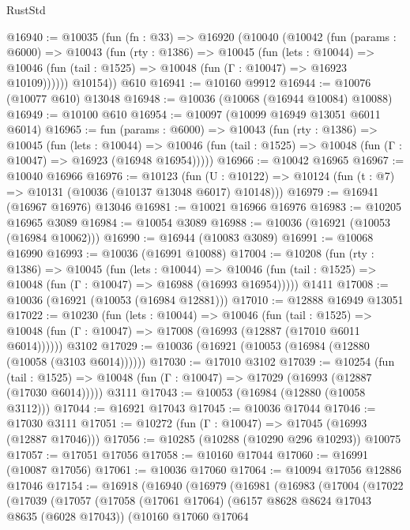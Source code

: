 \begin{lexlean}{RustStd}
\begin{coremodule}
{{@16940 := @10035
    (fun (fn : @33) =>
    @16920
      (@10040
        (@10042
          (fun (params : @6000) =>
          @10043
            (fun (rty : @1386) =>
            @10045
              (fun (lets : @10044) =>
              @10046 (fun (tail : @1525) => @10048 (fun (Γ : @10047) => @16923 @10109))))))
        @10154))
    @610
@16941 := @10160 @9912
@16944 := @10076 (@10077 @610) @13048
@16948 := @10036 (@10068 (@16944 @10084) @10088)
@16949 := @10100 @610
@16954 := @10097 (@10099 @16949 @13051 @6011 @6014)
@16965 := fun (params : @6000) =>
  @10043
    (fun (rty : @1386) =>
    @10045
      (fun (lets : @10044) =>
      @10046 (fun (tail : @1525) => @10048 (fun (Γ : @10047) => @16923 (@16948 @16954)))))
@16966 := @10042 @16965
@16967 := @10040 @16966
@16976 := @10123
    (fun (U : @10122) => @10124 (fun (t : @7) => @10131 (@10036 (@10137 @13048 @6017) @10148)))
@16979 := @16941 (@16967 @16976) @13046
@16981 := @10021 @16966 @16976
@16983 := @10205 @16965 @3089
@16984 := @10054 @3089
@16988 := @10036 (@16921 (@10053 (@16984 @10062)))
@16990 := @16944 (@10083 @3089)
@16991 := @10068 @16990
@16993 := @10036 (@16991 @10088)
@17004 := @10208
    (fun (rty : @1386) =>
    @10045
      (fun (lets : @10044) =>
      @10046 (fun (tail : @1525) => @10048 (fun (Γ : @10047) => @16988 (@16993 @16954)))))
    @1411
@17008 := @10036 (@16921 (@10053 (@16984 @12881)))
@17010 := @12888 @16949 @13051
@17022 := @10230
    (fun (lets : @10044) =>
    @10046
      (fun (tail : @1525) =>
      @10048 (fun (Γ : @10047) => @17008 (@16993 (@12887 (@17010 @6011 @6014))))))
    @3102
@17029 := @10036 (@16921 (@10053 (@16984 (@12880 (@10058 (@3103 @6014))))))
@17030 := @17010 @3102
@17039 := @10254
    (fun (tail : @1525) => @10048 (fun (Γ : @10047) => @17029 (@16993 (@12887 (@17030 @6014)))))
    @3111
@17043 := @10053 (@16984 (@12880 (@10058 @3112)))
@17044 := @16921 @17043
@17045 := @10036 @17044
@17046 := @17030 @3111
@17051 := @10272 (fun (Γ : @10047) => @17045 (@16993 (@12887 @17046)))
@17056 := @10285 (@10288 (@10290 @296 @10293)) @10075
@17057 := @17051 @17056
@17058 := @10160 @17044
@17060 := @16991 (@10087 @17056)
@17061 := @10036 @17060
@17064 := @10094 @17056 @12886 @17046
@17154 := @16918
    (@16940
      (@16979
        (@16981
          (@16983
            (@17004
              (@17022
                (@17039
                  (@17057
                    (@17058
                      (@17061 @17064)
                      (@6157 @8628 @8624 @17043 @8635 (@6028 @17043))
                      (@10160
                        @17060
                        @17064
}}
\end{coremodule}
\end{lexlean}

